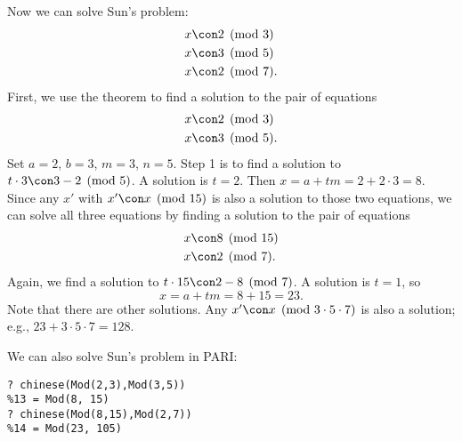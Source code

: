 \documentclass[11pt]{report}
\begin{document}
Now we can solve Sun's problem:
\begin{align*}
  x & \con 2 \pmod{3}  \\
  x & \con 3 \pmod{5}  \\
  x & \con 2 \pmod{7}.
\end{align*}
First, we use the theorem to find a solution to the pair
of equations
\begin{align*}
  x & \con 2 \pmod{3}  \\
  x & \con 3 \pmod{5}.
\end{align*}
Set $a=2$, $b=3$, $m=3$, $n=5$.
Step 1 is to find a solution to $t\cdot 3 \con 3-2\pmod{5}$.
A solution is $t=2$.  Then $x=a+tm=2+2\cdot 3 = 8$.
Since any $x'$ with $x'\con x\pmod{15}$ is also a solution to
those two equations, we can solve all three equations by
finding a solution to the pair of equations
\begin{align*}
  x & \con 8 \pmod{15} \\
  x & \con 2 \pmod{7}.
\end{align*}
Again, we find a solution to $t\cdot 15 \con 2-8\pmod{7}$.
A solution is $t = 1$, so
$$x=a+tm=8+15=23.$$
Note that there are other solutions.  Any $x'\con x\pmod{3\cdot 5\cdot 7}$
is also a solution; e.g., $23+3\cdot 5\cdot 7 = 128$.

We can also solve Sun's problem in PARI:
\begin{verbatim}
? chinese(Mod(2,3),Mod(3,5))
%13 = Mod(8, 15)
? chinese(Mod(8,15),Mod(2,7))
%14 = Mod(23, 105)
\end{verbatim}
\end{document}
